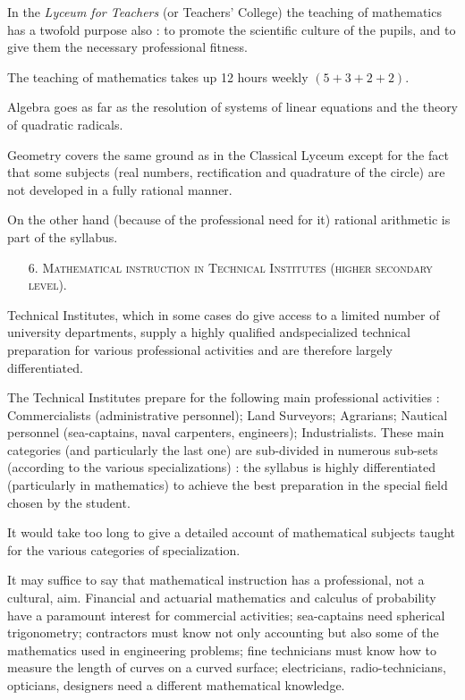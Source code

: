 In the {\em Lyceum for Teachers} (or Teachers' College) the teaching of mathematics has a twofold purpose also : to promote the scientific culture of the pupils, and to give them the necessary professional fitness.

The teaching of mathematics takes up 12 hours weekly $(5+3+2+2)$.

Algebra goes as far as the resolution of systems of linear equations and the theory of quadratic radicals.

Geometry covers the same ground as in the Classical Lyceum except for the fact that some subjects (real numbers, rectification and quadrature of the circle) are not developed in a fully rational manner.

On the other hand (because of the professional need for it) rational arithmetic is part of the syllabus.

\begin{itemize}
\item[6.] \textsc{Mathematical instruction in Technical Institutes (higher secondary level).}
\end{itemize}

Technical Institutes, which in some cases do give access to a limited number of university departments, supply a highly qualified and\pageoriginale specialized technical preparation for various professional activities and are therefore largely differentiated.

The Technical Institutes prepare for the following main professional activities : Commercialists (administrative personnel); Land Surveyors; Agrarians; Nautical personnel (sea-captains, naval carpenters, engineers); Industrialists. These main categories (and particularly the last one) are sub-divided in numerous sub-sets (according to the various specializations) : the syllabus is highly differentiated (particularly in mathematics) to achieve the best preparation in the special field chosen by the student.

It would take too long to give a detailed account of mathematical subjects taught for the various categories of specialization.

It may suffice to say that mathematical instruction has a professional, not a cultural, aim. Financial and actuarial mathematics and calculus of probability have a paramount interest for commercial activities; sea-captains need spherical trigonometry; contractors must know not only accounting but also some of the mathematics used in engineering problems; fine technicians must know how to measure the length of curves on a curved surface; electricians, radio-technicians, opticians, designers need a different mathematical knowledge.

